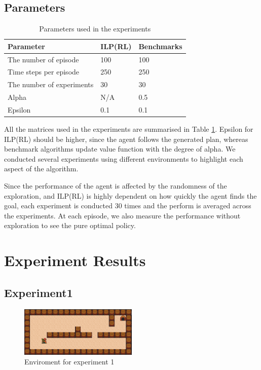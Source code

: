 \subsection{Parameters}
\begin{table}[!ht!b]
\centering
\begin{tabular}{lll}
\hline
Parameter            & ILP(RL)    & Benchmarks      \\ \hline
The number of episode& 100        & 100        \\
Time steps per episode& 250        & 250        \\
The number of experiments& 30       & 30       \\
Alpha                & N/A       & 0.5       \\
Epsilon              & 0.1        & 0.1        \\
\end{tabular}
\caption{Parameters used in the experiments}
\label{param}
\end{table}

All the matrices used in the experiments are summarised in Table \ref{param}.
Epsilon for ILP(RL) should be higher, since the agent follows the generated plan,
whereas benchmark algorithms update value function with the degree of alpha.
We conducted several experiments using different environments to highlight each aspect of the algorithm.

Since the performance of the agent is affected by the randomness of the exploration,
and ILP(RL) is highly dependent on how quickly the agent finds the goal,
each experiment is conducted 30 times and the perform is averaged across the experiments.
At each episode, we also measure the performance without exploration to see the pure optimal policy.

\section{Experiment Results}
\label{learning_evaluation}

\subsection{Experiment1}
\begin{figure}[!htb]
\centering
\includegraphics[width=0.5\textwidth]{./figures/experiment1}
\caption{Enviroment for experiment 1}
\label{experiment1}
\end{figure}

